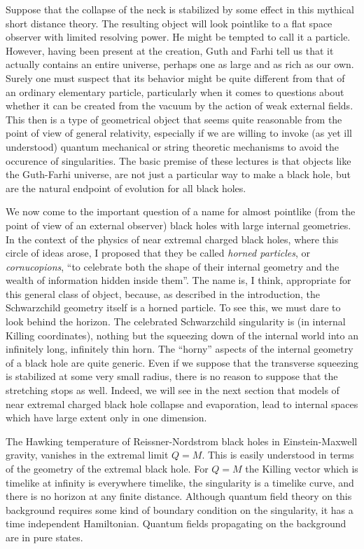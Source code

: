 Suppose that the collapse of the neck is stabilized by some effect in this
mythical short distance theory.  The resulting object will look pointlike
to a flat space observer with limited resolving power.  He might be tempted
to call it a particle.  However, having been present at the creation, Guth
and Farhi tell us that it actually contains an entire universe, perhaps one
as large and as rich as our own.  Surely one must suspect that its behavior
might be quite different from that of an ordinary elementary particle,
particularly when
it comes to questions about whether it can be created from the
vacuum by the action of weak external fields.
This then is a type of geometrical object that seems quite reasonable from
the point of view of general relativity, especially if we are willing to
invoke (as yet ill understood) quantum mechanical or string theoretic
mechanisms to avoid the occurence of singularities.  The basic premise of
these lectures is that objects like the Guth-Farhi universe, are not just
a particular way to make a black hole, but are the natural endpoint of
evolution for all black holes.

We now come to the important question of a name for almost pointlike (from the
point of view of an external observer) black holes with large internal
geometries.  In the context of the physics of near extremal charged black
holes, where this circle of ideas arose, I proposed that they be called
{\it horned particles}, or {\it cornucopions}, ``to celebrate both the shape
of their internal geometry and the wealth of information hidden inside them''.
The name is, I think, appropriate for this general class of object,
because, as described in the introduction, the Schwarzchild geometry
itself is
a horned particle.  To see
this, we must dare to look behind the horizon. The
celebrated Schwarzchild singularity is (in internal Killing coordinates),
nothing but the squeezing down of the internal world into an infinitely long,
infinitely thin horn.  The ``horny'' aspects of the internal geometry of
a black hole are quite generic.
Even if we suppose that the transverse squeezing
is stabilized at some very small radius, there is no reason to suppose
that the stretching stops as well.  Indeed, we will see in the next section
that models of near extremal charged black hole collapse and evaporation,
lead to internal spaces which have large extent only in one dimension.



The Hawking temperature
of Reissner-Nordstrom black holes in Einstein-Maxwell gravity,
vanishes in the extremal limit $Q = M$.  This is easily understood
in terms of the geometry of the extremal black hole.  For $Q=M$ the Killing
vector which is timelike at infinity is everywhere timelike, the singularity
is a timelike curve, and there is no horizon at any finite distance.
Although quantum field theory
on this background requires some kind of boundary condition on the singularity,
it has a time independent Hamiltonian.  Quantum fields
propagating on the background are in pure states.

